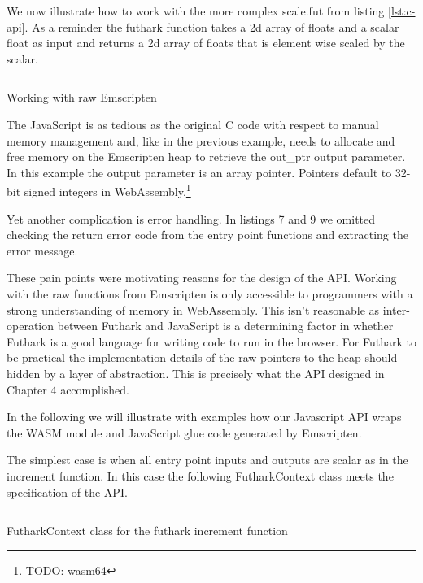 \documentclass[11pt]{book}
\begin{document}
We now illustrate how to work with the more complex scale.fut from listing \ref{lst:c-api}. As a reminder the futhark function takes a 2d array of floats and a scalar float as input and returns a 2d array of floats that is element wise scaled by the scalar. 

\begin{listing}[H] 
        \inputminted[fontsize=\small,baselinestretch=0.5,linenos]{JavaScript}{code/compiler/api_examples/raw.js}
        \caption{Working with raw Emscripten }
        \label{lst:raw}    
\end{listing} 

The JavaScript is as tedious as the original C code with respect to manual memory management and, like in the previous example, needs to allocate and free memory on the Emscripten heap to retrieve the out\_ptr output parameter. In this example the output parameter is an array pointer. Pointers default to 32-bit signed integers in WebAssembly.\footnote{TODO: wasm64}

Yet another complication is error handling. In listings 7 and 9 we omitted checking the return error code from the entry point functions and extracting the error message. 

These pain points were motivating reasons for the design of the API. Working with the raw functions from Emscripten is only accessible to programmers with a strong understanding of memory in WebAssembly. This isn't reasonable as inter-operation between Futhark and JavaScript is a determining factor in whether Futhark is a good language for writing code to run in the browser. For Futhark to be practical the implementation details of the raw pointers to the heap should hidden by a layer of abstraction. This is precisely what the API designed in Chapter 4 accomplished. 

In the following we will illustrate with examples how our Javascript API wraps the WASM module and JavaScript glue code generated by Emscripten.

The simplest case is when all entry point inputs and outputs are scalar as in the increment function. In this case the following FutharkContext class meets the specification of the API.

\begin{listing}[H] 
        \inputminted[fontsize=\small,baselinestretch=0.5,linenos]{JavaScript}{code/compiler/api_examples/FutharkContext_incr.js}
        \caption{FutharkContext class for the futhark increment function}
        \label{lst:FutharkContext_incr}    
\end{listing} 
\end{document}
